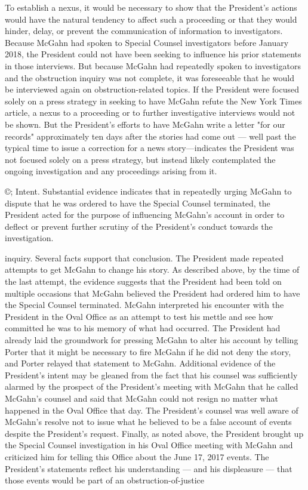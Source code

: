 {To establish a nexus, it would be necessary to show that the President's actions would have the natural tendency to affect such a proceeding or that they would hinder, delay, or prevent the communication of information to investigators.
Because McGahn had spoken to Special Counsel investigators before January 2018, the President could not have been seeking to influence his prior statements in those interviews.
But because McGahn had repeatedly spoken to investigators and the obstruction inquiry was not complete, it was foreseeable that he would be interviewed again on obstruction-related topics.
If the President were focused solely on a press strategy in seeking to have McGahn refute the New York Times article, a nexus to a proceeding or to further investigative interviews would not be shown.
But the President's efforts to have McGahn write a letter "for our records" approximately ten days after the stories had come out — well past the typical time to issue a correction for a news story—indicates the President was not focused solely on a press strategy, but instead likely contemplated the ongoing investigation and any proceedings arising from it.

©; Intent.
Substantial evidence indicates that in repeatedly urging McGahn to dispute that he was ordered to have the Special Counsel terminated, the President acted for the purpose of influencing McGahn's account in order to deflect or prevent further scrutiny of the President's conduct towards the investigation.

inquiry.
Several facts support that conclusion.
The President made repeated attempts to get McGahn to change his story.
As described above, by the time of the last attempt, the evidence suggests that the President had been told on multiple occasions that McGahn believed the President had ordered him to have the Special Counsel terminated.
McGahn interpreted his encounter with the President in the Oval Office as an attempt to test his mettle and see how committed he was to his memory of what had occurred.
The President had already laid the groundwork for pressing McGahn to alter his account by telling Porter that it might be necessary to fire McGahn if he did not deny the story, and Porter relayed that statement to McGahn.
Additional evidence of the President's intent may be gleaned from the fact that his counsel was sufficiently alarmed by the prospect of the President's meeting with McGahn that he called McGahn's counsel and said that McGahn could not resign no matter what happened in the Oval Office that day.
The President's counsel was well aware of McGahn's resolve not to issue what he believed to be a false account of events despite the President's request.
Finally, as noted above, the President brought up the Special Counsel investigation in his Oval Office meeting with McGahn and criticized him for telling this Office about the June 17, 2017 events.
The President's statements reflect his understanding — and his displeasure — that those events would be part of an obstruction-of-justice

}

